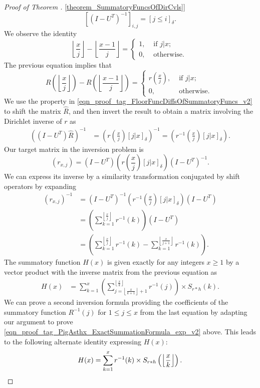 \documentclass[11pt,reqno,a4letter]{article}
\newcommand{\hlocalref}[1]{\hyperref[#1]{\ref{#1}}}
\numberwithin{equation}{section}
\numberwithin{figure}{section}
\numberwithin{table}{section}
\newcommand{\Iverson}[1]{\ensuremath{\left[#1\right]_{\delta}}}
\newcommand{\floor}[1]{\left\lfloor #1 \right\rfloor}
\newcommand{\Floor}[2]{\ensuremath{\left\lfloor \frac{#1}{#2} \right\rfloor}}
\theoremstyle{plain}
\numberwithin{theorem}{section}
\theoremstyle{definition}
\begin{document}
\begin{proof}[Proof of Theorem \hlocalref{theorem_SummatoryFuncsOfDirCvls}]
\[
\left[\left(I - U^T\right)^{-1}\right]_{i,j} = \Iverson{j \leq i}. 
\]
We observe the identity 
\[
\Floor{x}{j} - \Floor{x-1}{j} = \begin{cases} 
     1, & \text{ if $j|x$; } \\ 
     0, & \text{ otherwise. } 
     \end{cases} 
\] 
The previous equation implies that 
\begin{equation} 
\label{eqn_proof_tag_FloorFuncDiffsOfSummatoryFuncs_v2} 
R\left(\floor{\frac{x}{j}}\right) - R\left(\floor{\frac{x-1}{j}}\right) = 
     \begin{cases} 
     r\left(\frac{x}{j}\right), & \text{ if $j | x$; } \\ 
     0, & \text{ otherwise. } 
     \end{cases}
\end{equation} 
We use the property in \eqref{eqn_proof_tag_FloorFuncDiffsOfSummatoryFuncs_v2} 
to shift the matrix $\hat{R}$, and then invert the result to obtain a matrix involving the 
Dirichlet inverse of $r$ as 
\begin{align*} 
\left(\left(I-U^{T}\right) \hat{R}\right)^{-1} & = 
     \left(r\left(\frac{x}{j}\right) \Iverson{j|x}\right)^{-1} = 
     \left(r^{-1}\left(\frac{x}{j}\right) \Iverson{j|x}\right). 
\end{align*} 
Our target matrix in the inversion problem is 
$$(r_{x,j}) = \left(I-U^{T}\right) \left(r\left(\frac{x}{j}\right) \Iverson{j|x}\right) \left(I-U^{T}\right)^{-1}.$$
We can express its inverse by a similarity transformation conjugated by shift operators by expanding 
\begin{align*} 
(r_{x,j})^{-1} & = \left(I-U^{T}\right)^{-1} \left(r^{-1}\left(\frac{x}{j}\right) 
     \Iverson{j|x}\right) \left(I-U^{T}\right) \\ 
     & = \left(\sum_{k=1}^{\floor{\frac{x}{j}}} r^{-1}(k)\right) \left(I-U^{T}\right) \\ 
     & = \left(\sum_{k=1}^{\floor{\frac{x}{j}}} r^{-1}(k) - \sum_{k=1}^{\floor{\frac{x}{j+1}}} r^{-1}(k)\right). 
\end{align*} 
The summatory function $H(x)$ is given exactly for any integers $x \geq 1$ 
by a vector product with the inverse matrix from the previous equation as 
\begin{align*} 
H(x) & = \sum_{k=1}^x \left(\sum_{j=\floor{\frac{x}{k+1}}+1}^{\floor{\frac{x}{k}}} r^{-1}(j)\right) 
     \times S_{r \ast h}(k). 
\end{align*} 
We can prove a second inversion formula providing the coefficients of the summatory function 
$R^{-1}(j)$ for $1 \leq j \leq x$ from the last equation by adapting our argument to prove 
\eqref{eqn_proof_tag_PigAsthx_ExactSummationFormula_exp_v2} above. 
This leads to the following alternate identity expressing $H(x)$: 
\[
H(x) = \sum_{k=1}^{x} r^{-1}(k) \times S_{r \ast h}\left(\Floor{x}{k}\right). 
     \qedhere 
\]
\end{proof} 
\end{document}
